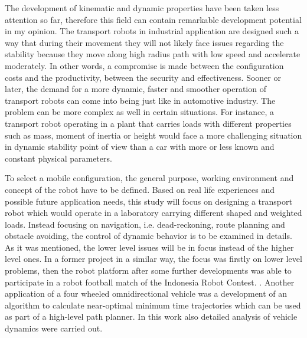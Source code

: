 \documentclass[12pt,english,twoside]{article}
\begin{document}
The development of kinematic and dynamic properties have been taken less attention so far, therefore this field can contain remarkable development potential in my opinion. The transport robots in industrial application are designed such a way that during their movement they will not likely face issues regarding the stability because they move along
high radius path with low speed and accelerate moderately. In other words, a compromise is made between the configuration costs and the productivity, between the security and effectiveness. Sooner or later, the demand for a more dynamic, faster and smoother operation of transport robots can come into being just like in automotive industry. The problem can be more complex as well in certain situations. For instance, a transport robot operating in a plant that carries loads with different properties such as mass, moment of inertia or height would face a more challenging situation in dynamic stability point of view than a car with more or less known and constant physical parameters.

To select a mobile configuration, the general purpose, working environment and concept of the robot have to be defined. Based on real life experiences and possible future application needs, this study will focus on designing a transport robot which would operate in a laboratory carrying different shaped and weighted loads. Instead focusing on navigation, i.e. dead-reckoning, route planning and obstacle avoiding, the control of dynamic behavior is to be examined in details.  As it was mentioned, the lower level issues will be in focus instead of the higher level ones. In  a former project in a similar way, the focus was firstly on lower level problems, then the robot platform after some further developments was able to participate in a robot football match of the Indonesia Robot Contest. \cite{robot_focis}. Another application of a four wheeled omnidirectional vehicle was a development of an algorithm to calculate near-optimal minimum time trajectories which can be used as part of a high-level path planner. \cite{robot_focis_2} In this work also detailed analysis of vehicle dynamics were carried out.
\end{document}
